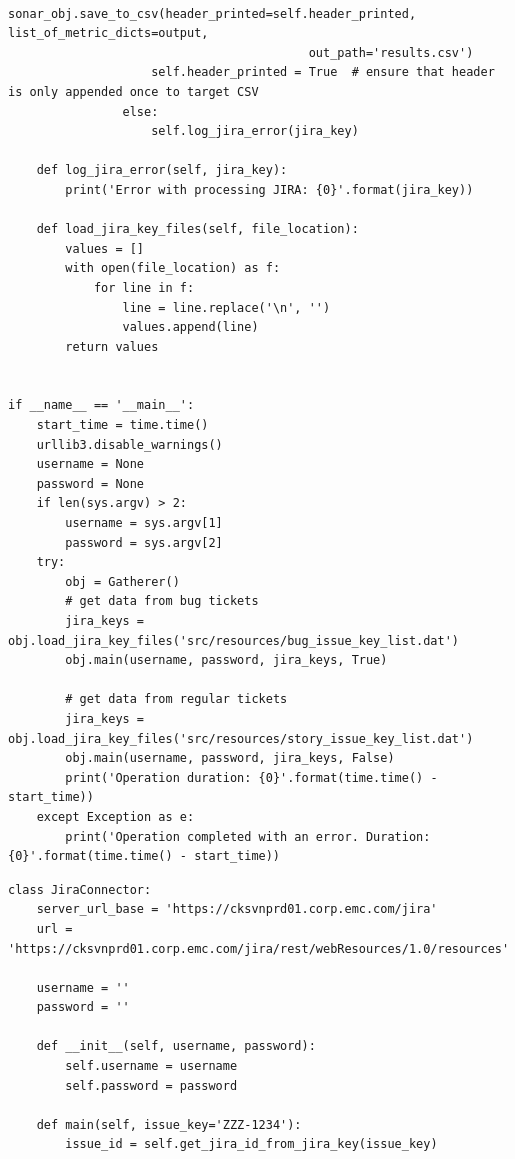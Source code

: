 \begin{landscape}
\begin{code}
\begin{verbatim}
                    sonar_obj.save_to_csv(header_printed=self.header_printed, list_of_metric_dicts=output,
                                          out_path='results.csv')
                    self.header_printed = True  # ensure that header is only appended once to target CSV
                else:
                    self.log_jira_error(jira_key)

    def log_jira_error(self, jira_key):
        print('Error with processing JIRA: {0}'.format(jira_key))

    def load_jira_key_files(self, file_location):
        values = []
        with open(file_location) as f:
            for line in f:
                line = line.replace('\n', '')
                values.append(line)
        return values


if __name__ == '__main__':
    start_time = time.time()
    urllib3.disable_warnings()
    username = None
    password = None
    if len(sys.argv) > 2:
        username = sys.argv[1]
        password = sys.argv[2]
    try:
        obj = Gatherer()
        # get data from bug tickets
        jira_keys = obj.load_jira_key_files('src/resources/bug_issue_key_list.dat')
        obj.main(username, password, jira_keys, True)

        # get data from regular tickets
        jira_keys = obj.load_jira_key_files('src/resources/story_issue_key_list.dat')
        obj.main(username, password, jira_keys, False)
        print('Operation duration: {0}'.format(time.time() - start_time))
    except Exception as e:
        print('Operation completed with an error. Duration: {0}'.format(time.time() - start_time))

\end{verbatim}
\end{code}



\begin{code}
\label{code:jira-connector.py}
\begin{verbatim}
class JiraConnector:
    server_url_base = 'https://cksvnprd01.corp.emc.com/jira'
    url = 'https://cksvnprd01.corp.emc.com/jira/rest/webResources/1.0/resources'

    username = ''
    password = ''

    def __init__(self, username, password):
        self.username = username
        self.password = password

    def main(self, issue_key='ZZZ-1234'):
        issue_id = self.get_jira_id_from_jira_key(issue_key)


\end{verbatim}
\end{code}
\end{landscape}
